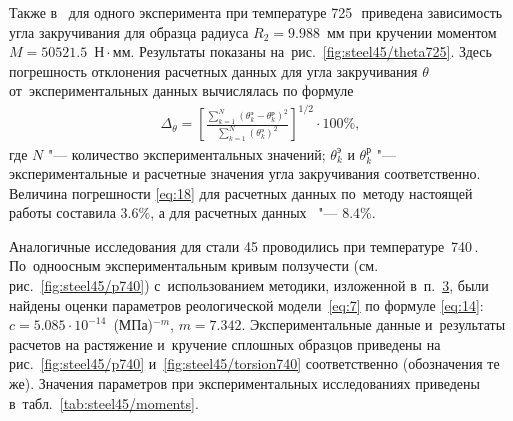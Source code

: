Также в~\cite{Banschikova} для одного эксперимента при температуре 725\,\textcelsius\ приведена зависимость угла закручивания для образца радиуса $R_2=9.988$~мм при кручении моментом $M=50521.5$~Н${}\cdot{}$мм. 
Результаты показаны на~рис.~\ref{fig:steel45/theta725}.
Здесь погрешность отклонения расчетных данных для угла закручивания $\theta$ от~экспериментальных данных вычислялась по формуле
\begin{gather} \label{eq:18}
 	\displaystyle \Delta_\theta = \left[\frac{\sum_{k=1}^N \left( \theta_{k}^\text{э} - \theta_{k}^\text{р} \right)^2}{\sum_{k=1}^N \left( \theta_{k}^\text{э} \right)^2} \right]^{1/2} \cdot 100 \%,
\end{gather}
где $N$ "--- количество экспериментальных значений; $\theta_{k}^\text{э}$ и $\theta_{k}^\text{р}$ "--- экспериментальные и расчетные значения угла закручивания соответственно.
Величина погрешности \eqref{eq:18} для расчетных данных по~методу настоящей работы составила $3.6\%$, а для расчетных данных~\cite{Banschikova} "--- $8.4\%$.




Аналогичные исследования для стали 45 проводились при температуре~740\,\textcelsius. 
По~одноосным экспериментальным кривым ползучести (см. рис.~\ref{fig:steel45/p740}) с~использованием методики, изложенной в~п.~\hyperlink{ts:3}{3}, были найдены оценки параметров реологической модели~\eqref{eq:7} по формуле \eqref{eq:14}: $c= 5.085 \cdot 10^{-14}$~(МПа)$^{-m}$, $m=7.342$. 
Экспериментальные данные и~результаты расчетов на растяжение и~кручение сплошных образцов приведены на рис.~\ref{fig:steel45/p740} и~\ref{fig:steel45/torsion740} соответственно (обозначения те же). 
Значения параметров при экспериментальных исследованиях приведены в~табл.~\ref{tab:steel45/moments}.



